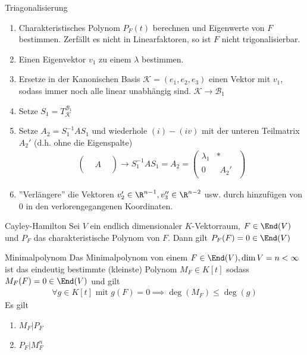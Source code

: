 \begin{rezept}{Triagonalisierung}
    \begin{enumerate}[{(}i{)}]
        \item	Charakteristisches Polynom $P_F(t)$ berechnen und Eigenwerte von $F$ bestimmen. Zerfällt es nicht in Linearfaktoren, so ist $F$ nicht trigonalisierbar. 
        \item Einen Eigenvektor $v_1$ zu einem $\lambda$ bestimmen. 
        \item   Ersetze in der Kanonischen Basis $\mathcal{K} = (e_1, e_2, e_3)$ einen Vektor mit $v_1$, sodass immer noch alle linear unabhängig sind. $\mathcal{K} \to \mathcal{B}_1$
        \item   Setze $S_1 = T_{\mathcal{K}}^{\mathcal{B}_1}$
        \item   Setze $A_2 = S_1^{-1} A S_1$ und wiederhole $(i) - (iv)$ mit der unteren Teilmatrix $A_2'$ (d.h. ohne die Eigenspalte)
        \begin{align*}
            \begin{pmatrix}
                & &\\
                & A &\\
                & & 
            \end{pmatrix}
            \to S_1^{-1}AS_1 = A_2 = \begin{pmatrix}
                \lambda_1 & * \\
                0 & \begin{matrix}
                    A_2'
                \end{matrix}
            \end{pmatrix}
        \end{align*}
        \item   ''Verlängere'' die Vektoren $v_2' \in \R^{n-1}, v_3'' \in \R^{n-2}$ usw. durch hinzufügen von $0$ in den verlorengegangenen Koordinaten.
    \end{enumerate}
\end{rezept}


\begin{satz}{Cayley-Hamilton}
    Sei $V$ ein endlich dimensionaler $K$-Vektorraum, $F \in \End(V)$ und $P_F$ das charakteristische Polynom von $F$. Dann gilt $P_F(F) = 0 \in \End(V)$ 
\end{satz}


\begin{definition}{Minimalpolynom}
    Das Minimalpolynom von einem $F \in \End(V), \dim V = n < \infty$ ist das eindeutig bestimmte (kleinste) Polynom $M_F \in K[t]$ sodass $M_F(F) = 0 \in \End(V)$ und gilt
    \begin{align*}
        \forall g \in K[t] \text{ mit } g(F) = 0 \implies \deg(M_F) \leq \deg(g)
    \end{align*}
    Es gilt 
    \begin{enumerate}[{(}i{)}]
        \item   $M_F | P_F$
        \item   $P_F  | M_F^n$
    \end{enumerate}
\end{definition}

